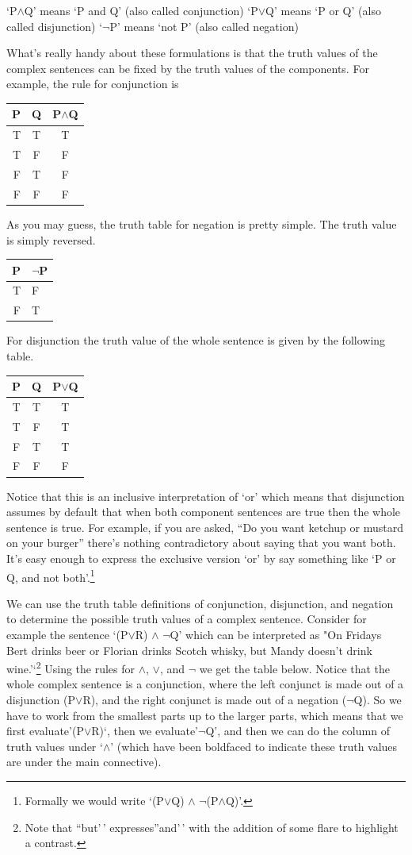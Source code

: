 \documentclass[]{tufte-book}
\begin{document}
`P\(\wedge\)Q' means `P and Q' (also called conjunction)
`P\(\vee\)Q' means `P or Q' (also called disjunction)
`\(\neg\)P' means `not P' (also called negation)

What's really handy about these formulations is that the truth values of the complex sentences can be fixed by the truth values of the components. For example, the rule for conjunction is

\begin{longtable}[]{@{}rcc@{}}
\toprule
P & Q & P\(\wedge\)Q\tabularnewline
\midrule
\endhead
T & T & T\tabularnewline
T & F & F\tabularnewline
F & T & F\tabularnewline
F & F & F\tabularnewline
\bottomrule
\end{longtable}

As you may guess, the truth table for negation is pretty simple. The truth value is simply reversed.

\begin{longtable}[]{@{}rl@{}}
\toprule
P & \(\neg\)P\tabularnewline
\midrule
\endhead
T & F\tabularnewline
F & T\tabularnewline
\bottomrule
\end{longtable}

For disjunction the truth value of the whole sentence is given by the following table.

\begin{longtable}[]{@{}ccc@{}}
\toprule
P & Q & P\(\vee\)Q\tabularnewline
\midrule
\endhead
T & T & T\tabularnewline
T & F & T\tabularnewline
F & T & T\tabularnewline
F & F & F\tabularnewline
\bottomrule
\end{longtable}

Notice that this is an inclusive interpretation of `or' which means that disjunction assumes by default that when both component sentences are true then the whole sentence is true. For example, if you are asked, ``Do you want ketchup or mustard on your burger'' there's nothing contradictory about saying that you want both. It's easy enough to express the exclusive version `or' by say something like `P or Q, and not both'.\footnote{Formally we would write `(P\(\vee\)Q) \(\wedge\) \(\neg\)(P\(\wedge\)Q)'.}

We can use the truth table definitions of conjunction, disjunction, and negation to determine the possible truth values of a complex sentence. Consider for example the sentence `(P\(\vee\)R) \(\wedge\) \(\neg\)Q' which can be interpreted as "On Fridays Bert drinks beer or Florian drinks Scotch whisky, but Mandy doesn't drink wine.'`\footnote{Note that ``but'\,' expresses''and'\,' with the addition of some flare to highlight a contrast.} Using the rules for \(\wedge\), \(\vee\), and \(\neg\) we get the table below. Notice that the whole complex sentence is a conjunction, where the left conjunct is made out of a disjunction (P\(\vee\)R), and the right conjunct is made out of a negation (\(\neg\)Q). So we have to work from the smallest parts up to the larger parts, which means that we first evaluate'(P\(\vee\)R)`, then we evaluate'\(\neg\)Q', and then we can do the column of truth values under `\(\wedge\)' (which have been boldfaced to indicate these truth values are under the main connective).
\end{document}

